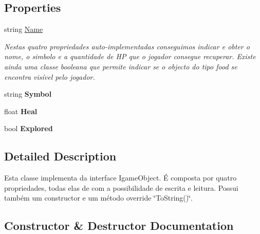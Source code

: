 \subsection*{Properties}
\begin{DoxyCompactItemize}
\item 
string \mbox{\hyperlink{class_projeto2___l_p1_1_1_food_aa86fad941d17cf9d1972fc6da07c8359}{Name}}
\begin{DoxyCompactList}\small\item\em Nestas quatro propriedades auto-\/implementadas conseguimos indicar e obter o nome, o simbolo e a quantidade de HP que o jogador consegue recuperar. Existe ainda uma classe booleana que permite indicar se o objecto do tipo food se encontra visível pelo jogador. \end{DoxyCompactList}\item 
\mbox{\label{class_projeto2___l_p1_1_1_food_ab03fb301f423d5ef269f47fb9bdeb700}} 
string {\bfseries Symbol}
\item 
\mbox{\label{class_projeto2___l_p1_1_1_food_a3bc9b2fc0df5bccca3bf44a66461113a}} 
float {\bfseries Heal}
\item 
\mbox{\label{class_projeto2___l_p1_1_1_food_a2ef9ed365195c5de82903d08cc1bb50b}} 
bool {\bfseries Explored}
\end{DoxyCompactItemize}


\subsection{Detailed Description}
Esta classe implementa da interface Igame\+Object. É composta por quatro propriedades, todas elas de com a possibilidade de escrita e leitura. Possui também um constructor e um método override \char`\"{}\+To\+String()\char`\"{}. 



\subsection{Constructor \& Destructor Documentation}
\mbox{\label{class_projeto2___l_p1_1_1_food_a61b898d655fa0265e899150e52d6b566}} 
